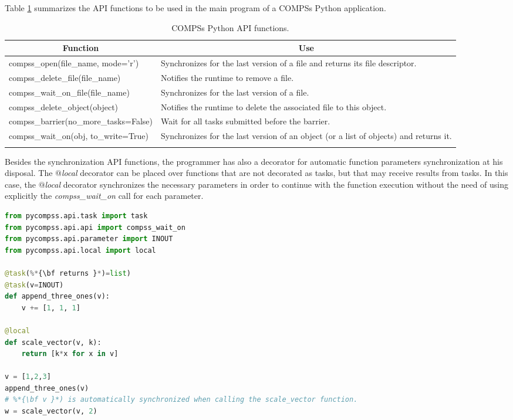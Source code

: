 Table \ref{tab:python_api_functions} summarizes the API functions to be used in the main program of a COMPSs Python application.
\bgroup
  \def\arraystretch{1.5}%
  \begin{longtable}{| p{} | p{} |}
    \hline
    \multicolumn{1}{|c|}{{\bf Function }}    &  \multicolumn{1}{c|}{{\bf Use }}\\
    \hline
    compss\_open(file\_name, mode='r') & Synchronizes for the last version of a file and returns its file descriptor. \\
    \hline
    compss\_delete\_file(file\_name) & Notifies the runtime to remove a file. \\
    \hline
    compss\_wait\_on\_file(file\_name) & Synchronizes for the last version of a file. \\
    \hline
    compss\_delete\_object(object) & Notifies the runtime to delete the associated file to this object. \\
    \hline
    compss\_barrier(no\_more\_tasks=False) & Wait for all tasks submitted before the barrier. \\
    \hline
    compss\_wait\_on(obj, to\_write=True) & Synchronizes for the last version of an object (or a list of objects) and returns it. \\
    \hline
    \caption{COMPSs Python API functions.}
    \label{tab:python_api_functions}
  \end{longtable}
\egroup

Besides the synchronization API functions, the programmer has also a decorator for automatic function parameters synchronization 
at his disposal. The {\it $@$local} decorator can be placed over functions that are not decorated as tasks, but that may receive 
results from tasks. In this case, the {\it $@$local} decorator synchronizes the necessary parameters in order to continue with 
the function execution without the need of using explicitly the {\it compss\_wait\_on} call for each parameter.

\begin{lstlisting}[language=python]
from pycompss.api.task import task
from pycompss.api.api import compss_wait_on
from pycompss.api.parameter import INOUT
from pycompss.api.local import local

@task(%*{\bf returns }*)=list)
@task(v=INOUT)
def append_three_ones(v):
    v += [1, 1, 1]

@local
def scale_vector(v, k):
    return [k*x for x in v]

v = [1,2,3]
append_three_ones(v)
# %*{\bf v }*) is automatically synchronized when calling the scale_vector function.
w = scale_vector(v, 2)

\end{lstlisting}


